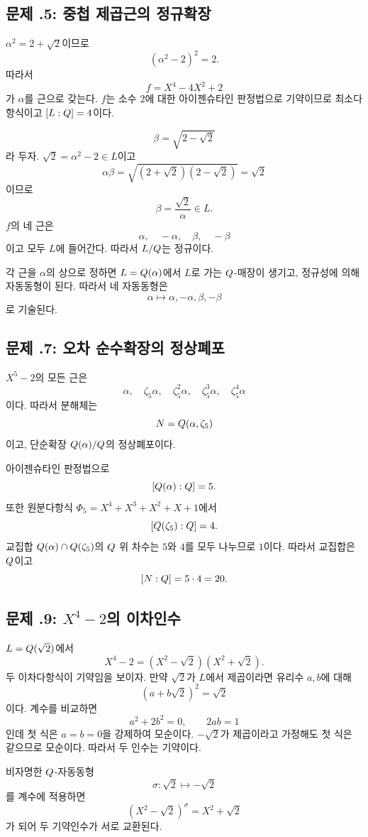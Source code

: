 \subsection*{문제 \thechapter.5: 중첩 제곱근의 정규확장}

\begin{solution}
$\alpha^2=2+\sqrt2$이므로
\[
  (\alpha^2-2)^2=2.
\]
따라서
\[
  f=X^4-4X^2+2
\]
가 $\alpha$를 근으로 갖는다. $f$는 소수 $2$에 대한 아이젠슈타인 판정법으로 기약이므로 최소다항식이고 $[L:Q]=4$이다.

\[
  \beta=\sqrt{2-\sqrt2}
\]
라 두자. $\sqrt2=\alpha^2-2\in L$이고
\[
  \alpha\beta=\sqrt{(2+\sqrt2)(2-\sqrt2)}=\sqrt2
\]
이므로
\[
  \beta=\frac{\sqrt2}{\alpha}\in L.
\]
$f$의 네 근은
\[
  \alpha,\quad-\alpha,\quad\beta,\quad-\beta
\]
이고 모두 $L$에 들어간다. 따라서 $L/Q$는 정규이다.

각 근을 $\alpha$의 상으로 정하면 $L=Q(\alpha)$에서 $L$로 가는 $Q$-매장이 생기고, 정규성에 의해 자동동형이 된다. 따라서 네 자동동형은
\[
  \alpha\longmapsto
  \alpha,-\alpha,\beta,-\beta
\]
로 기술된다.
\end{solution}

\subsection*{문제 \thechapter.7: 오차 순수확장의 정상폐포}

\begin{solution}
$X^5-2$의 모든 근은
\[
  \alpha,\quad\zeta_5\alpha,\quad\zeta_5^2\alpha,\quad
  \zeta_5^3\alpha,\quad\zeta_5^4\alpha
\]
이다. 따라서 분해체는
\[
  N=Q(\alpha,\zeta_5)
\]
이고, 단순확장 $Q(\alpha)/Q$의 정상폐포이다.

아이젠슈타인 판정법으로
\[
  [Q(\alpha):Q]=5.
\]
또한 원분다항식 $\Phi_5=X^4+X^3+X^2+X+1$에서
\[
  [Q(\zeta_5):Q]=4.
\]
교집합 $Q(\alpha)\cap Q(\zeta_5)$의 $Q$ 위 차수는 $5$와 $4$를 모두 나누므로 $1$이다. 따라서 교집합은 $Q$이고
\[
  [N:Q]=5\cdot4=20.
\]
\end{solution}

\subsection*{문제 \thechapter.9: $X^4-2$의 이차인수}

\begin{solution}
$L=Q(\sqrt2)$에서
\[
  X^4-2=(X^2-\sqrt2)(X^2+\sqrt2).
\]
두 이차다항식이 기약임을 보이자. 만약 $\sqrt2$가 $L$에서 제곱이라면 유리수 $a,b$에 대해
\[
  (a+b\sqrt2)^2=\sqrt2
\]
이다. 계수를 비교하면
\[
  a^2+2b^2=0,\qquad 2ab=1
\]
인데 첫 식은 $a=b=0$을 강제하여 모순이다. $-\sqrt2$가 제곱이라고 가정해도 첫 식은 같으므로 모순이다. 따라서 두 인수는 기약이다.

비자명한 $Q$-자동동형
\[
  \sigma:\sqrt2\longmapsto-\sqrt2
\]
를 계수에 적용하면
\[
  (X^2-\sqrt2)^\sigma=X^2+\sqrt2
\]
가 되어 두 기약인수가 서로 교환된다.
\end{solution}

